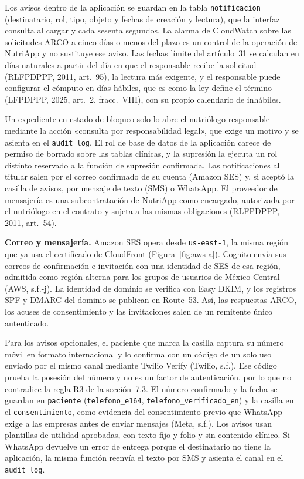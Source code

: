\documentclass[12pt, a4paper]{article}
\begin{document}
Los avisos dentro de la aplicación se guardan en la tabla
\texttt{notificacion} (destinatario, rol, tipo, objeto y fechas de
creación y lectura), que la interfaz consulta al cargar y cada sesenta
segundos. La alarma de CloudWatch sobre las solicitudes ARCO a cinco
días o menos del plazo es un control de la operación de NutriApp y no
sustituye ese aviso. Las fechas límite del artículo~31 se calculan en
días naturales a partir del día en que el responsable recibe la
solicitud (RLFPDPPP, 2011, art.~95), la lectura más exigente, y el
responsable puede configurar el cómputo en días hábiles, que es como
la ley define el término (LFPDPPP, 2025, art.~2, fracc.~VIII), con su
propio calendario de inhábiles.

Un expediente en estado de bloqueo solo lo abre el nutriólogo
responsable mediante la acción «consulta por responsabilidad legal», que
exige un motivo y se asienta en el \texttt{audit\_log}. El rol de base
de datos de la aplicación carece de permiso de borrado sobre las tablas
clínicas, y la supresión la ejecuta un rol distinto reservado a la
función de supresión confirmada. Las notificaciones al titular salen por
el correo confirmado de su cuenta (Amazon SES) y, si aceptó la casilla
de avisos, por mensaje de texto (SMS) o WhatsApp. El proveedor de
mensajería es una subcontratación de NutriApp como encargado, autorizada
por el nutriólogo en el contrato y sujeta a las mismas obligaciones
(RLFPDPPP, 2011, art.~54).
 
\textbf{Correo y mensajería.} Amazon SES opera desde \texttt{us-east-1},
la misma región que ya usa el certificado de CloudFront
(Figura~\ref{fig:aws-a}). Cognito envía sus correos de confirmación e
invitación con una identidad de SES de esa región, admitida como región
alterna para los grupos de usuarios de México Central (AWS, s.f.-j). La
identidad de dominio se verifica con Easy DKIM, y los registros SPF y
DMARC del dominio se publican en Route~53. Así, las respuestas ARCO, los
acuses de consentimiento y las invitaciones salen de un remitente único
autenticado.

Para los avisos opcionales, el paciente que marca la casilla captura su
número móvil en formato internacional y lo confirma con un código de un
solo uso enviado por el mismo canal mediante Twilio Verify (Twilio,
s.f.). Ese código prueba la posesión del número y no es un factor de
autenticación, por lo que no contradice la regla R3 de la sección~7.3.
El número confirmado y la fecha se guardan en \texttt{paciente}
(\texttt{telefono\_e164}, \texttt{telefono\_verificado\_en}) y la
casilla en el \texttt{consentimiento}, como evidencia del consentimiento
previo que WhatsApp exige a las empresas antes de enviar mensajes (Meta,
s.f.). Los avisos usan plantillas de utilidad aprobadas, con texto fijo
y folio y sin contenido clínico. Si WhatsApp devuelve un error de
entrega porque el destinatario no tiene la aplicación, la misma función
reenvía el texto por SMS y asienta el canal en el \texttt{audit\_log}.
 
\end{document}
